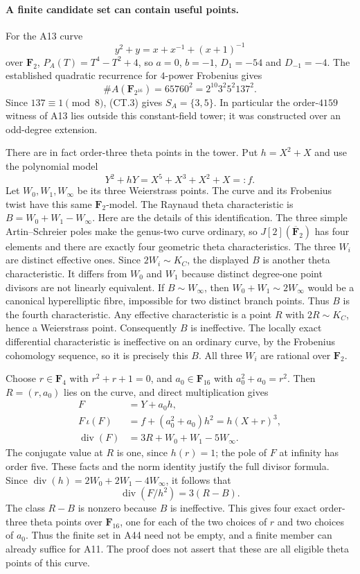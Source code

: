 \documentclass[11pt,a4paper]{article}
\begin{document}
\paragraph{A finite candidate set can contain useful points.}
For the A13 curve
\[
 y^2+y=x+x^{-1}+(x+1)^{-1}
\]
over $\mathbf F_2$, $P_A(T)=T^4-T^2+4$, so $a=0$, $b=-1$,
$D_1=-54$ and $D_{-1}=-4$. The established quadratic recurrence
for $4$-power Frobenius gives
\[
 \#A(\mathbf F_{2^{16}})=65760^2
                    =2^{10}3^2 5^2 137^2.
 \tag{CT.14}
\]
Since $137\equiv1\pmod8$, (CT.3) gives $S_A=\{3,5\}$.
In particular the order-$4159$ witness of A13 lies outside this
constant-field tower; it was constructed over an odd-degree
extension.

There are in fact order-three theta points in the tower.
Put $h=X^2+X$ and use the polynomial model
\[
 Y^2+hY=X^5+X^3+X^2+X=:f.
\]
Let $W_0,W_1,W_\infty$ be its three Weierstrass points.
The curve and its Frobenius twist have this same
$\mathbf F_2$-model. The Raynaud theta characteristic is
$B=W_0+W_1-W_\infty$.
Here are the details of this identification. The three simple
Artin--Schreier poles make the genus-two curve ordinary, so
$J[2](\overline{\mathbf F}_2)$ has four elements and there are
exactly four geometric theta characteristics. The three $W_i$
are distinct effective ones. Since $2W_i\sim K_C$, the displayed
$B$ is another theta characteristic. It differs from $W_0$
and $W_1$ because distinct degree-one point divisors are not
linearly equivalent. If $B\sim W_\infty$, then
$W_0+W_1\sim2W_\infty$ would be a canonical hyperelliptic fibre,
impossible for two distinct branch points. Thus $B$ is the
fourth characteristic. Any effective characteristic is a point
$R$ with $2R\sim K_C$, hence a Weierstrass point. Consequently
$B$ is ineffective. The locally exact differential
characteristic is ineffective on an ordinary curve, by the
Frobenius cohomology sequence, so it is precisely this $B$.
All three $W_i$ are rational over $\mathbf F_2$.

Choose $r\in\mathbf F_4$ with $r^2+r+1=0$, and
$a_0\in\mathbf F_{16}$ with $a_0^2+a_0=r^2$.
Then $R=(r,a_0)$ lies on the curve, and direct multiplication gives
\[
 \begin{aligned}
 F&=Y+a_0h,\\
 F\,\iota(F)&=f+(a_0^2+a_0)h^2
                          =h(X+r)^3,\\
 \operatorname{div}(F)&=3R+W_0+W_1-5W_\infty.
 \end{aligned}
 \tag{CT.15}
\]
The conjugate value at $R$ is one, since $h(r)=1$; the pole of
$F$ at infinity has order five. These facts and the norm identity
justify the full divisor formula. Since
$\operatorname{div}(h)=2W_0+2W_1-4W_\infty$, it follows that
\[
                    \operatorname{div}(F/h^2)=3(R-B).
 \tag{CT.16}
\]
The class $R-B$ is nonzero because $B$ is ineffective.
This gives four exact order-three theta points over
$\mathbf F_{16}$, one for each of the two choices of $r$ and
two choices of $a_0$. Thus the finite set in A44 need not be
empty, and a finite member can already suffice for A11.
The proof does not assert that these are all eligible theta
points of this curve.
\end{document}
